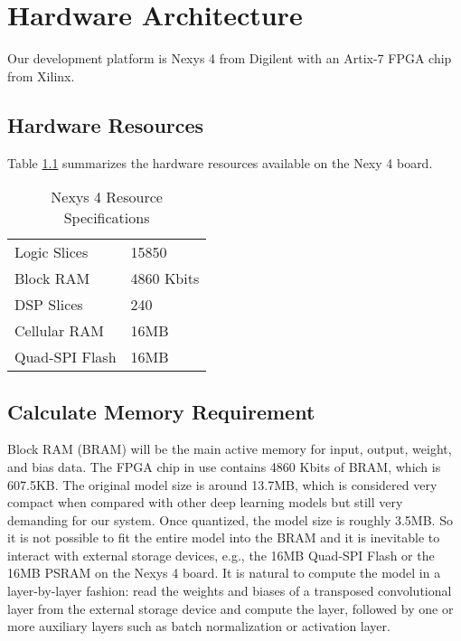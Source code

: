 
\chapter{Hardware Architecture}

Our development platform is Nexys 4 from Digilent with an Artix-7 FPGA chip from Xilinx.

\section{Hardware Resources}

Table \ref{table:hardware_resources} summarizes the hardware resources available on the Nexy 4 board.

\begin{table}[h]
  \centering
  \caption{Nexys 4 Resource Specifications}
  \begin{tabular}{l | l}
    Logic Slices & 15850 \\
    Block RAM & 4860 Kbits \\
    DSP Slices & 240 \\
    Cellular RAM & 16MB \\
    Quad-SPI Flash & 16MB
  \end{tabular}
  \label{table:hardware_resources}
\end{table}

\section{Calculate Memory Requirement}

Block RAM (BRAM) will be the main active memory for input, output, weight, and bias data. The FPGA chip in use
contains 4860 Kbits of BRAM, which is 607.5KB. The original model size is around 13.7MB, which is
considered very compact when compared with other deep learning models but still very demanding for
our system. Once quantized, the model size is roughly 3.5MB. So it is not possible to fit the entire model
into the BRAM and it is inevitable to interact with external storage devices, e.g., the 16MB Quad-SPI Flash
or the 16MB PSRAM on the Nexys 4 board. It is natural to compute the model in a layer-by-layer fashion: read
the weights and biases of a transposed convolutional layer from the external storage device and compute the
layer, followed by one or more auxiliary layers such as batch normalization or activation layer.

\clearpage %
